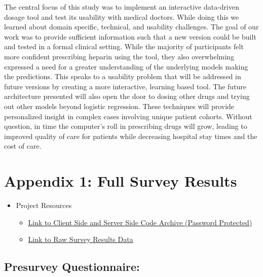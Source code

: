 \documentclass[12pt,a4paper,]{report}
\providecommand{\tightlist}{%
  \setlength{\itemsep}{0pt}\setlength{\parskip}{0pt}}
\begin{document}
The central focus of this study was to implement an interactive
data-driven dosage tool and test its usability with medical doctors.
While doing this we learned about domain specific, technical, and
usability challenges. The goal of our work was to provide sufficient
information such that a new version could be built and tested in a
formal clinical setting. While the majority of participants felt more
confident prescribing heparin using the tool, they also overwhelming
expressed a need for a greater understanding of the underlying models
making the predictions. This speaks to a usability problem that will be
addressed in future versions by creating a more interactive, learning
based tool. The future architecture presented will also open the door to
dosing other drugs and trying out other models beyond logistic
regression. These techniques will provide personalized insight in
complex cases involving unique patient cohorts. Without question, in
time the computer's roll in prescribing drugs will grow, leading to
improved quality of care for patients while decreasing hospital stay
times and the cost of care.

\newpage

\hypertarget{appendix-1-full-survey-results}{\chapter*{Appendix 1: Full
Survey Results}\label{appendix-1-full-survey-results}}

\begin{itemize}
\tightlist
\item
  Project Resources

  \begin{itemize}
  \tightlist
  \item
    \href{https://github.com/joer14/ThesisPaper/blob/master/publicCodeEn.zip?raw=true}{Link
    to Client Side and Server Side Code Archive (Password Protected)}
  \item
    \href{https://hepstack-stage.herokuapp.com/responses}{Link to Raw
    Survey Results Data}
  \end{itemize}
\end{itemize}

\section{Presurvey Questionnaire:}\label{presurvey-questionnaire}
\end{document}
